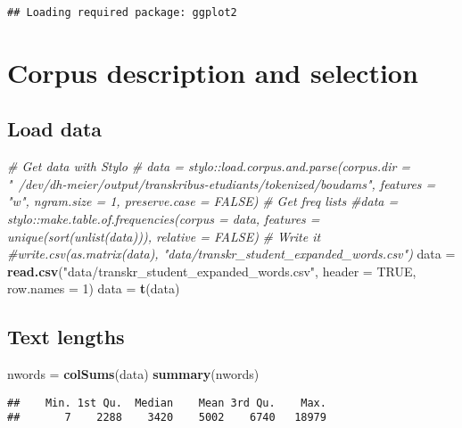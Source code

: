 \documentclass[]{article}
\newenvironment{Shaded}{\begin{snugshade}}{\end{snugshade}}
\newcommand{\CommentTok}[1]{\textcolor[rgb]{0.56,0.35,0.01}{\textit{#1}}}
\newcommand{\DataTypeTok}[1]{\textcolor[rgb]{0.13,0.29,0.53}{#1}}
\newcommand{\DecValTok}[1]{\textcolor[rgb]{0.00,0.00,0.81}{#1}}
\newcommand{\KeywordTok}[1]{\textcolor[rgb]{0.13,0.29,0.53}{\textbf{#1}}}
\newcommand{\NormalTok}[1]{#1}
\newcommand{\OtherTok}[1]{\textcolor[rgb]{0.56,0.35,0.01}{#1}}
\newcommand{\StringTok}[1]{\textcolor[rgb]{0.31,0.60,0.02}{#1}}
\begin{document}
\begin{verbatim}
## Loading required package: ggplot2
\end{verbatim}

\hypertarget{corpus-description-and-selection}{%
\section{Corpus description and
selection}\label{corpus-description-and-selection}}

\hypertarget{load-data}{%
\subsection{Load data}\label{load-data}}

\begin{Shaded}
\begin{Highlighting}[]
\CommentTok{# Get data with Stylo}
\CommentTok{# data = stylo::load.corpus.and.parse(corpus.dir = "~/dev/dh-meier/output/transkribus-etudiants/tokenized/boudams", features = "w", ngram.size = 1, preserve.case = FALSE)}
\CommentTok{# Get freq lists}
\CommentTok{#data = stylo::make.table.of.frequencies(corpus = data, features = unique(sort(unlist(data))), relative = FALSE)}
\CommentTok{# Write it}
\CommentTok{#write.csv(as.matrix(data), "data/transkr_student_expanded_words.csv")}
\NormalTok{data =}\StringTok{ }\KeywordTok{read.csv}\NormalTok{(}\StringTok{"data/transkr_student_expanded_words.csv"}\NormalTok{, }\DataTypeTok{header =} \OtherTok{TRUE}\NormalTok{, }\DataTypeTok{row.names =} \DecValTok{1}\NormalTok{)}
\NormalTok{data =}\StringTok{ }\KeywordTok{t}\NormalTok{(data)}
\end{Highlighting}
\end{Shaded}

\hypertarget{text-lengths}{%
\subsection{Text lengths}\label{text-lengths}}

\begin{Shaded}
\begin{Highlighting}[]
\NormalTok{nwords =}\StringTok{ }\KeywordTok{colSums}\NormalTok{(data)}
\KeywordTok{summary}\NormalTok{(nwords)}
\end{Highlighting}
\end{Shaded}

\begin{verbatim}
##    Min. 1st Qu.  Median    Mean 3rd Qu.    Max. 
##       7    2288    3420    5002    6740   18979
\end{verbatim}
\end{document}
